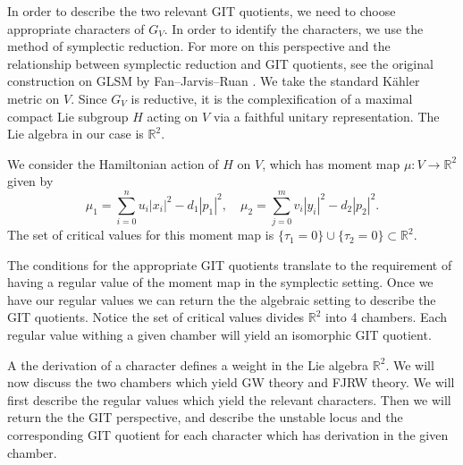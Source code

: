 \documentclass[10pt, letterpaper]{amsart}
\theoremstyle{remark}
\newcommand{\RR}{\mathbb{R}}
\newcommand{\cG}{\mathcal{G}}
\newcommand{\set}[1]{\{#1\}}
\newcommand{\nathan}[1]{\todo[color=pistachio,fancyline]{N:#1}}
\newcommand{\andrew}[1]{\todo[fancyline]{An:#1}}
\begin{document}
In order to describe the two relevant GIT quotients, we need to choose appropriate characters of $G_V$. In order to identify the characters, we use the method of symplectic reduction. For more on this perspective and the relationship between symplectic reduction and GIT quotients, see the original construction on GLSM by Fan--Jarvis--Ruan \cite{FJR15}. We take the standard K\"ahler metric on $V$. Since $G_V$ is reductive, it is the complexification of a maximal compact Lie subgroup $H$ acting on $V$ via a faithful unitary representation. The Lie algebra in our case is $\RR^2$. 

We consider the Hamiltonian action of $H$ on $V$, which has moment map $\mu:V\to \RR^2$ given by 
\[
\mu_1 = \sum_{i=0}^n u_i|x_i|^2 - d_1|p_1|^2, \quad \mu_2 = \sum_{j=0}^m v_i|y_i|^2 - d_2|p_2|^2.
\]
The set of critical values for this moment map is $\set{\tau_1=0}\cup\set{\tau_2=0}\subset \RR^2$.

The conditions for the appropriate GIT quotients translate to the requirement of having a regular value of the moment map in the symplectic setting. Once we have our regular values we can return the the algebraic setting to describe the GIT quotients.  Notice the set of critical values divides $\RR^2$ into 4 chambers. Each regular value withing a given chamber will yield an isomorphic GIT quotient. 

A the derivation of a character defines a weight in the Lie algebra $\RR^2$. We will now discuss the two chambers which yield GW theory and FJRW theory. We  will first describe the regular values which yield the relevant characters. Then we will return the the GIT perspective, and describe the unstable locus and the corresponding GIT quotient for each character which has derivation in the given chamber. 

\end{document}
